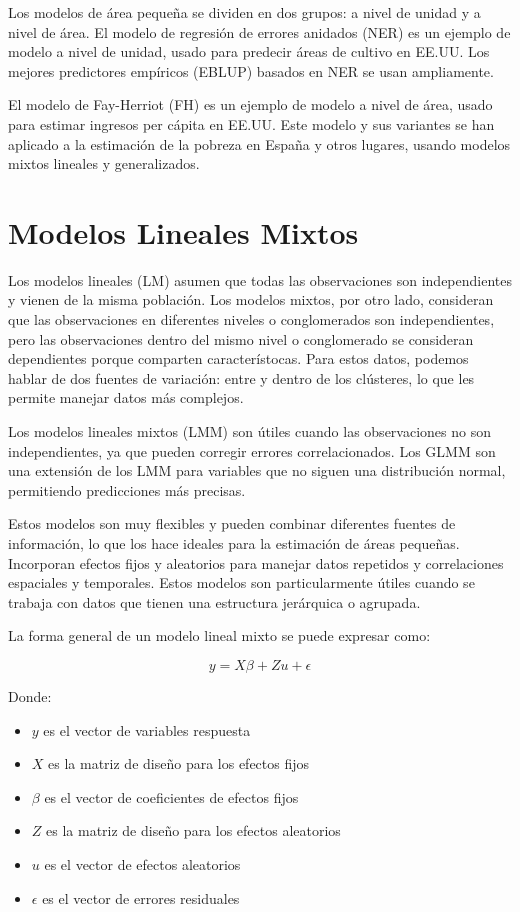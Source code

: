\documentclass[12pt,spanish]{article}
\begin{document}
Los modelos de área pequeña se dividen en dos grupos: a nivel de unidad y a nivel de área. El modelo de regresión de errores anidados (NER) es un ejemplo de modelo a nivel de unidad, usado para predecir áreas de cultivo en EE.UU. Los mejores predictores empíricos (EBLUP) basados en NER se usan ampliamente. 

El modelo de Fay-Herriot (FH) es un ejemplo de modelo a nivel de área, usado para estimar ingresos per cápita en EE.UU. Este modelo y sus variantes se han aplicado a la estimación de la pobreza en España y otros lugares, usando modelos mixtos lineales y generalizados.

\section*{Modelos Lineales Mixtos}

Los modelos lineales (LM) asumen que todas las observaciones son independientes y vienen de la misma población. Los modelos mixtos, por otro lado, consideran que las observaciones en diferentes niveles o conglomerados son independientes, pero las observaciones dentro del mismo nivel o conglomerado se consideran dependientes porque comparten característocas. Para estos datos, podemos hablar de dos fuentes de variación: entre y dentro de los clústeres, lo que les permite manejar datos más complejos.

Los modelos lineales mixtos (LMM) son útiles cuando las observaciones no son independientes, ya que pueden corregir errores correlacionados. Los GLMM son una extensión de los LMM para variables que no siguen una distribución normal, permitiendo predicciones más precisas.

Estos modelos son muy flexibles y pueden combinar diferentes fuentes de información, lo que los hace ideales para la estimación de áreas pequeñas. Incorporan efectos fijos y aleatorios para manejar datos repetidos y correlaciones espaciales y temporales. Estos modelos son particularmente útiles cuando se trabaja con datos que tienen una estructura jerárquica o agrupada.

La forma general de un modelo lineal mixto se puede expresar como:

$$y = X\beta + Zu + \epsilon$$

Donde:
\begin{itemize}
    \item $y$ es el vector de variables respuesta
    \item $X$ es la matriz de diseño para los efectos fijos
    \item $\beta$ es el vector de coeficientes de efectos fijos
    \item $Z$ es la matriz de diseño para los efectos aleatorios
    \item $u$ es el vector de efectos aleatorios
    \item $\epsilon$ es el vector de errores residuales
\end{itemize}
\end{document}
